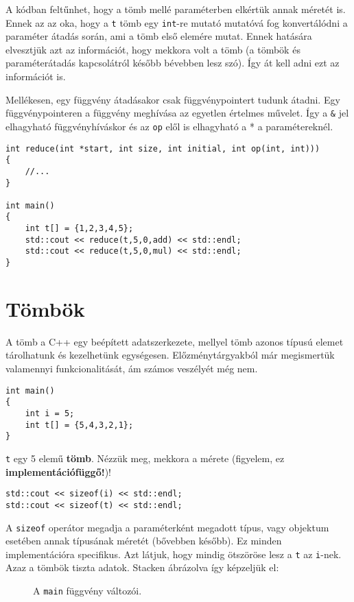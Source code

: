 \documentclass[a4paper,11.5pt,table]{article}
\begin{document}
	A kódban feltűnhet, hogy a tömb mellé paraméterben elkértük annak méretét is. Ennek az az oka, hogy a \texttt{t} tömb egy \texttt{int}-re mutató mutatóvá fog konvertálódni a paraméter átadás során, ami a tömb első elemére mutat. Ennek hatására elvesztjük azt az információt, hogy mekkora volt a tömb (a tömbök és paraméterátadás kapcsolátról később bévebben lesz szó). Így át kell adni ezt az információt is. 
	
	Mellékesen, egy függvény átadásakor csak függvénypointert tudunk átadni. Egy függvénypointeren a függvény meghívása az egyetlen értelmes művelet. Így a \texttt{\&} jel elhagyható függvényhíváskor és az \texttt{op} elől is elhagyható a * a paramétereknél.
	\begin{lstlisting}
int reduce(int *start, int size, int initial, int op(int, int)))
{
	//...
}

int main()
{
	int t[] = {1,2,3,4,5};
	std::cout << reduce(t,5,0,add) << std::endl;
	std::cout << reduce(t,5,0,mul) << std::endl;
}
	\end{lstlisting}
	\section{Tömbök}
	A tömb a C++ egy beépített adatszerkezete, mellyel tömb azonos típusú elemet tárolhatunk és kezelhetünk egységesen. Előzménytárgyakból már megismertük valamennyi funkcionalitását, ám számos veszélyét még nem.
		\begin{lstlisting}
int main()
{
	int i = 5;
	int t[] = {5,4,3,2,1};
}
		\end{lstlisting}
		\texttt{t} egy 5 elemű \textbf{tömb}. Nézzük meg, mekkora a mérete (figyelem, ez \textbf{implementációfüggő!})!
		\begin{lstlisting}
std::cout << sizeof(i) << std::endl;
std::cout << sizeof(t) << std::endl;
		\end{lstlisting}
		A \texttt{sizeof} operátor megadja a paraméterként megadott típus, vagy objektum esetében annak típusának méretét (bővebben később). Ez minden implementációra specifikus. Azt látjuk, hogy mindig ötszöröse lesz a \texttt{t} az \texttt{i}-nek. Azaz a tömbök tiszta adatok.  Stacken ábrázolva így képzeljük el:
		
		\begin{figure}[!h]
			\centering
			\smallskip
			
			A \texttt{main} függvény változói.
		\end{figure}
\end{document}
